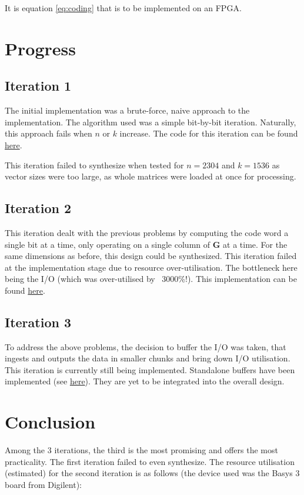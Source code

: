 \documentclass[a4paper,12pt]{article}
\begin{document}
It is equation \ref{eq:coding} that is to be implemented on an FPGA.

\section{Progress}

\subsection{Iteration 1}
The initial implementation was a brute-force, naive approach to the
implementation. The algorithm used was a simple bit-by-bit iteration.
Naturally, this approach fails when $n$ or $k$ increase. The code for this
iteration can be found
\href{https://github.com/CodePurble/ldpc-fpga/blob/main/hdl/encode.v}{here}.

This iteration failed to synthesize when tested for $n = 2304$ and $k = 1536$
as vector sizes were too large, as whole matrices were loaded at once for
processing.

\subsection{Iteration 2}
This iteration dealt with the previous problems by computing the code word a
single bit at a time, only operating on a single column of $\boldsymbol{G}$ at
a time. For the same dimensions as before, this design could be synthesized.
This iteration failed at the implementation stage due to resource
over-utilisation. The bottleneck here being the I/O (which was over-utilised by
~3000\%!). This implementation can be found
\href{https://github.com/CodePurble/ldpc-fpga/commit/9727b4bf16ffcc5572a6b557ddc749873093d5c3}{here}.

\subsection{Iteration 3}
To address the above problems, the decision to buffer the I/O was taken, that
ingests and outputs the data in smaller chunks and bring down I/O utilisation.
This iteration is currently still being implemented. Standalone buffers have
been implemented (see
\href{https://github.com/CodePurble/ldpc-fpga/tree/re-arch#readme}{here}). They
are yet to be integrated into the overall design.

\section{Conclusion}
Among the 3 iterations, the third is the most promising and offers the most
practicality. The first iteration failed to even synthesize. The resource
utilisation (estimated) for the second iteration is as follows (the device used
was the Basys 3 board from Digilent):
\end{document}
